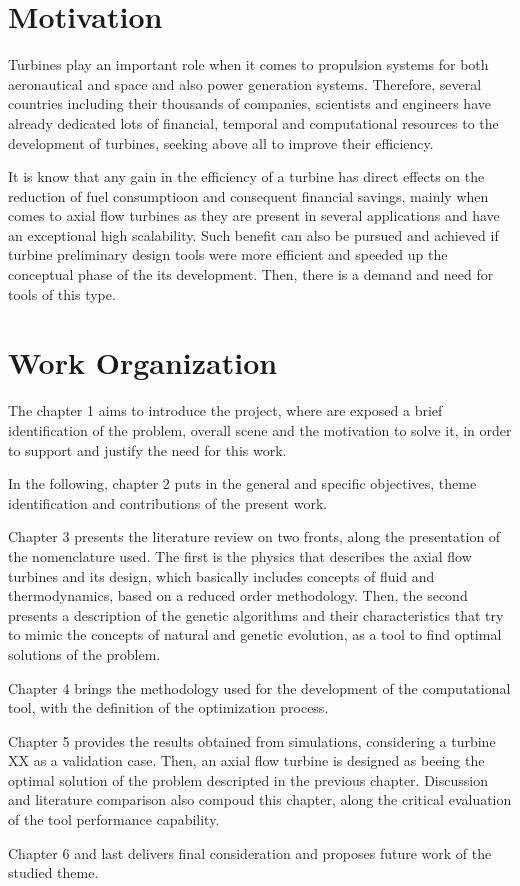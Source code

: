 \section{Motivation}
Turbines play an important role when it comes to propulsion systems for both aeronautical and space and also power generation systems. Therefore, several countries including their thousands of companies, scientists and engineers have already dedicated lots of financial, temporal and computational resources to the development of turbines, seeking above all to improve their efficiency.

It is know that any gain in the efficiency of a turbine has direct effects on the reduction of fuel consumptioon and consequent financial savings, mainly when comes to axial flow turbines as they are present in several applications and have an exceptional high scalability. Such benefit can also be pursued and achieved if turbine preliminary design tools were more efficient and speeded up the conceptual phase of the its development. Then, there is a demand and need for tools of this type. 

\section{Work Organization}
The chapter 1 aims to introduce the project, where are exposed a brief identification of the problem, overall scene and the motivation to solve it, in order to support and justify the need for this work.

In the following, chapter 2 puts in the general and specific objectives, theme identification and contributions of the present work.

Chapter 3 presents the literature review on two fronts, along the presentation of the nomenclature used. The first is the physics that describes the axial flow turbines and its design, which basically includes concepts of fluid and thermodynamics, based on a reduced order methodology. Then, the second presents a description of the genetic algorithms and their characteristics that try to mimic the concepts of natural and genetic evolution, as a tool to find optimal solutions of the problem.

Chapter 4 brings the methodology used for the development of the computational tool, with the definition of the optimization process. 

Chapter 5 provides the results obtained from simulations, considering a turbine XX as a validation case. Then, an axial flow turbine is designed as beeing the optimal solution of the problem descripted in the previous chapter. Discussion and literature comparison also compoud this chapter, along the critical evaluation of the tool performance capability.

Chapter 6 and last delivers final consideration and proposes future work of the studied theme.

